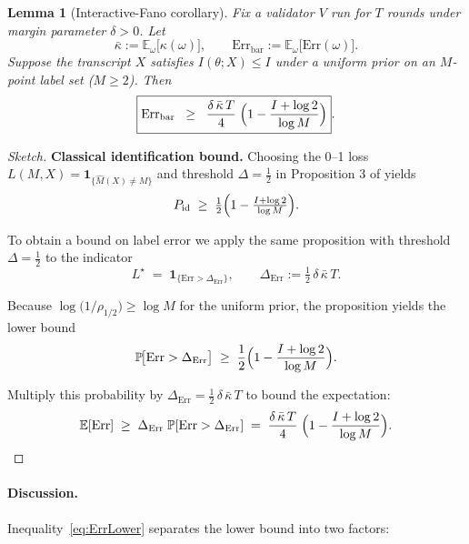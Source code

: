 \documentclass[11pt]{article}
\newcommand{\Err}{\mathrm{Err}}
\newcommand{\Prb}{\mathbb{P}}  %
\newcommand{\kappabar}{\bar{\kappa}}
\newcommand{\E}{\mathbb{E}}
\newtheorem{lemma}{Lemma}
\begin{document}
\begin{lemma}[Interactive-Fano corollary]\label{lem:ErrLower}
  Fix a validator $V$ run for $T$ rounds under margin parameter $\delta>0$.
  Let
  \[
    \kappabar
      :=\mathbb{E}_{\omega}\bigl[\kappa(\omega)\bigr],
    \qquad
    \Err_{\mathrm{bar}}
      :=\mathbb{E}_{\omega}\bigl[\Err(\omega)\bigr].
  \]
  Suppose the transcript $X$ satisfies
  $I(\theta;X)\le I$
  under a uniform prior on an $M$-point label set ($M\ge 2$).
  Then
  \begin{equation}\label{eq:ErrLower}   %
    \boxed{%
      \Err_{\mathrm{bar}}
      \;\;\ge\;\;
      \frac{\delta\,\kappabar\,T}{4}\;
      \Bigl(
        1-\dfrac{I+\log 2}{\log M}
      \Bigr)
    }.
  \end{equation}
\end{lemma}

\begin{proof}[Sketch]

\textbf{Classical identification bound.}
Choosing the 0–1 loss $L(M,X)=\mathbf 1_{\{\hat M(X)\neq M\}}$
and threshold $\Delta=\tfrac12$
in Proposition 3 of \citet{chen2024interfano} yields
\[
  P_{\mathrm{id}}
  \;\ge\;
  \tfrac12\Bigl(1-\tfrac{I+\log 2}{\log M}\Bigr).
\]

\medskip
\noindent
To obtain a bound on label error we apply the same proposition with 
threshold $\Delta=\tfrac12$ to the indicator
\[
  L^\star \;=\; \mathbf 1_{\{\Err>\Delta_{\mathrm{Err}}\}},
  \qquad
  \Delta_{\mathrm{Err}} := \tfrac12\,\delta\,\kappabar\,T.
\]



\item
  Because $\log \!\bigl(1/\rho_{1/2}\bigr)\ge\log M$ for the uniform
  prior, the proposition yields the lower bound
  \[
    \Prb\!\bigl[\Err>\Delta_{\mathrm{Err}}\bigr]
      \;\ge\;
      \frac12\Bigl(
        1-\frac{I+\log 2}{\log M}
      \Bigr).
  \]

\item
  Multiply this probability by
  $\Delta_{\mathrm{Err}}=\tfrac12\,\delta\,\kappabar\,T$
  to bound the expectation:
  \[
    \E[\Err]
      \;\ge\;
      \Delta_{\mathrm{Err}}\;
      \Prb[\Err>\Delta_{\mathrm{Err}}]
      \;=\;
      \frac{\delta\,\kappabar\,T}{4}\;
      \Bigl(
        1-\frac{I+\log 2}{\log M}
      \Bigr).
      \qedhere
  \]


\end{proof}

\paragraph{Discussion.}
Inequality~\eqref{eq:ErrLower} separates the lower bound into two
factors:
\end{document}
